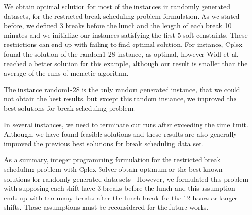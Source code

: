 We obtain optimal solution for most of the instances in randomly generated datasets, for the restricted break scheduling problem formulation. As we stated before, we defined 3 breaks before the lunch and the length of each break 10 minutes and we initialize our instances satisfying the first 5 soft constaints. These restrictions can end up with failing to find optimal solution.  For instance, Cplex found the solution of the random1-28 instance, as optimal, however Widl et al. reached a better solution for this example, although our result is smaller than the average of the runs of memetic algorithm. 

The instance random1-28 is the only random generated instance, that we could not obtain the best results, but except this random instance, we improved the best solutions for break scheduling problem.

In several instances, we need to terminate our runs after exceeding the time limit. Although, we have found feasible solutions and these results are also generally improved the previous best solutions for break scheduling data set.

As a summary, integer programming formulation for the restricted break scheduling problem with Cplex Solver obtain optimum or the best known solutions for randomly generated data sets . However, we formulated this problem with supposing each shift have 3 breaks before the lunch and this assumption ends up with too many breaks after the lunch break for the 12 hours or longer shifts. These assumptions must be reconsidered for the future works.